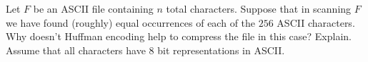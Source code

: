 Let $F$ be an ASCII file containing $n$ total characters.  Suppose
that in scanning $F$ we have found (roughly) equal occurrences of each
of the $256$ ASCII characters. Why doesn't Huffman encoding help to
compress the file in this case?  Explain.  Assume that all characters
have $8$ bit representations in ASCII.

